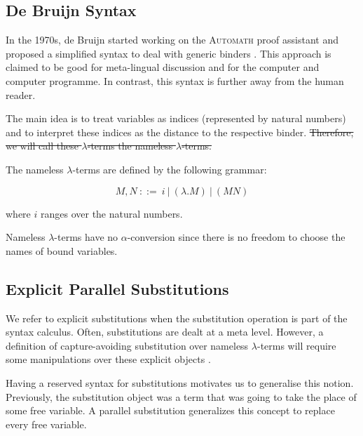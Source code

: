 
\subsection{De Bruijn Syntax}

\cite{deBruijn} \cite{AutosubstSchafer}

In the 1970s, de Bruijn started working on the \textsc{Automath} proof assistant and proposed a simplified syntax to deal with generic binders \cite{deBruijn}.
This approach is claimed to be good for meta-lingual discussion and for the computer and computer programme. In contrast, this syntax is further away from the human reader.

The main idea is to treat variables as indices (represented by natural numbers) and to interpret these indices as the distance to the respective binder.
\sout{Therefore, we will call these $\lambda$-terms the nameless $\lambda$-terms.}

\begin{definition}
  The nameless $\lambda$-terms are defined by the following grammar:

  \[ M, N \ ::= \ i \ | \ (\lambda . M) \ | \ (M N) \]

  where $i$ ranges over the natural numbers.
\end{definition}

\begin{remark}
  Nameless $\lambda$-terms have no $\alpha$-conversion since there is no freedom to choose the names of bound variables.
\end{remark}

\subsection{Explicit Parallel Substitutions}

\cite{AutosubstSchafer}

We refer to explicit substitutions \cite{Abadi} when the substitution operation is part of the syntax calculus.
Often, substitutions are dealt at a meta level.
However, a definition of capture-avoiding substitution over nameless $\lambda$-terms will require some manipulations over these explicit objects \cite{deBruijn}.

Having a reserved syntax for substitutions motivates us to generalise this notion.
Previously, the substitution object was a term that was going to take the place of some free variable.
A parallel substitution generalizes this concept to replace every free variable. 

